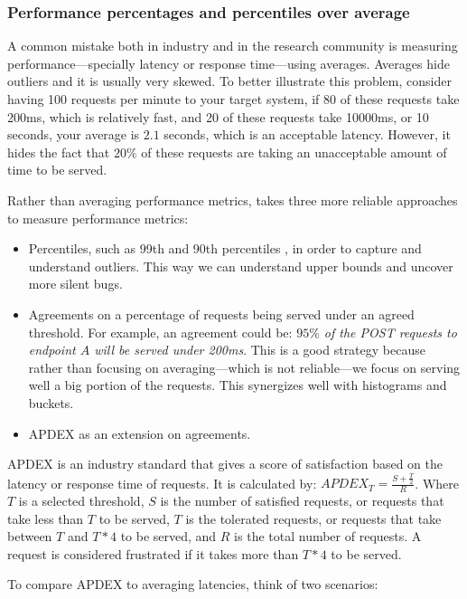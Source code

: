 \subsubsection{Performance percentages and percentiles over average}

A common mistake both in industry and in the research community is measuring performance---specially latency or response time---using averages. Averages hide outliers and it is usually very skewed. To better illustrate this problem, consider having 100 requests per minute to your target system, if 80 of these requests take 200ms, which is relatively fast, and 20 of these requests take 10000ms, or 10 seconds, your average is $2.1$ seconds, which is an acceptable latency. However, it hides the fact that $20\%$ of these requests are taking an unacceptable amount of time to be served.

Rather than averaging performance metrics, \projectname{} takes three more reliable approaches to measure performance metrics:

\begin{itemize}
  \item Percentiles, such as 99th and 90th percentiles , in order to capture and understand outliers. This way we can understand upper bounds and uncover more silent bugs.
  \item Agreements on a percentage of requests being served under an agreed threshold. For example, an agreement could be: \textit{$95\%$ of the POST requests to endpoint $A$ will be served under 200ms}. This is a good strategy because rather than focusing on averaging---which is not reliable---we focus on serving well a big portion of the requests. This synergizes well with histograms and buckets.
  \item APDEX \cite{Apdex} as an extension on agreements.
\end{itemize}

APDEX is an industry standard that gives a score of satisfaction based on the latency or response time of requests. It is calculated by: $APDEX_T = \frac{S + \frac{T}{2}}{R}$. Where $T$ is a selected threshold, $S$ is the number of satisfied requests, or requests that take less than $T$ to be served, $T$ is the tolerated requests, or requests that take between $T$ and $T*4$ to be served, and $R$ is the total number of requests. A request is considered frustrated if it takes more than $T*4$ to be served.

To compare APDEX to averaging latencies, think of two scenarios:

